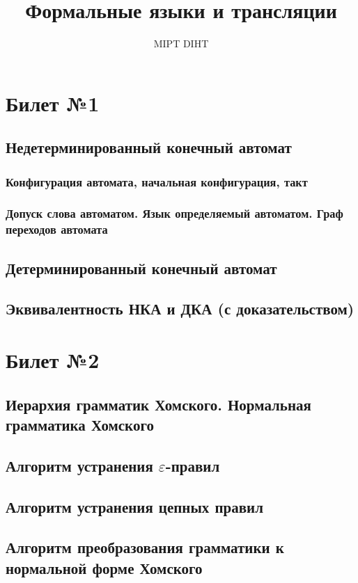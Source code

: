 \documentclass[a4paper]{article}
\title{Формальные языки и трансляции}
\author{MIPT DIHT}
\theoremstyle{plain}
\theoremstyle{remark}
\theoremstyle{definition}
\begin{document}
\maketitle

\section{Билет №1}
\subsection{Недетерминированный конечный автомат}
\subsubsection{Конфигурация автомата, начальная конфигурация, такт}
\subsubsection{Допуск слова автоматом. Язык определяемый автоматом. Граф переходов автомата}
\subsection{Детерминированный конечный автомат}
\subsection{Эквивалентность НКА и ДКА (с доказательством)}

\section{Билет №2}
\subsection{Иерархия грамматик Хомского. Нормальная грамматика Хомского}
\subsection{Алгоритм устранения $\varepsilon$-правил}
\subsection{Алгоритм устранения цепных правил}
\subsection{Алгоритм преобразования грамматики к нормальной форме Хомского}
\end{document}
